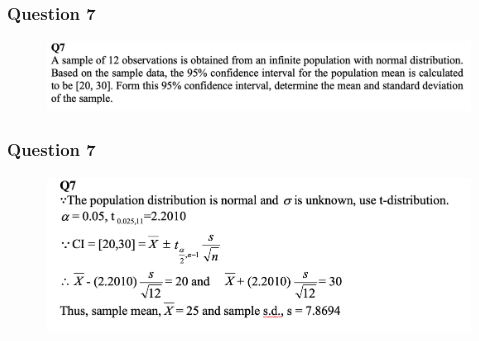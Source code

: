 \documentclass{beamer}
\begin{document}
\begin{frame}
\frametitle{Question 7}

\begin{figure}
	\begin{center}
		\includegraphics[scale=0.30]{Q7.png}
	\end{center}
\end{figure}
\end{frame}
\begin{frame}
\frametitle{Question 7}
\begin{figure}
\begin{center}
	\includegraphics[scale=0.35]{Q7_sol.png}
\end{center}
\end{figure}
\end{frame}
\end{document}
